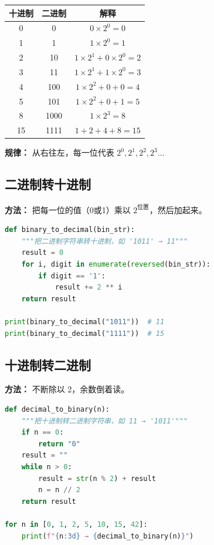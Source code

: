 \documentclass[a4paper,12pt]{ctexart}
\begin{document}
\begin{center}
\begin{tabular}{|c|c|c|}
\hline
\textbf{十进制} & \textbf{二进制} & \textbf{解释} \\ \hline
0 & 0 & $0 \times 2^0 = 0$ \\ \hline
1 & 1 & $1 \times 2^0 = 1$ \\ \hline
2 & 10 & $1 \times 2^1 + 0 \times 2^0 = 2$ \\ \hline
3 & 11 & $1 \times 2^1 + 1 \times 2^0 = 3$ \\ \hline
4 & 100 & $1 \times 2^2 + 0 + 0 = 4$ \\ \hline
5 & 101 & $1 \times 2^2 + 0 + 1 = 5$ \\ \hline
8 & 1000 & $1 \times 2^3 = 8$ \\ \hline
15 & 1111 & $1+2+4+8 = 15$ \\ \hline
\end{tabular}
\end{center}

\textbf{规律：} 从右往左，每一位代表 $2^0, 2^1, 2^2, 2^3 \dots$

\subsection*{二进制转十进制}

\textbf{方法：} 把每一位的值（0或1）乘以 $2^{\text{位置}}$，然后加起来。

\begin{lstlisting}[language=Python]
def binary_to_decimal(bin_str):
    """把二进制字符串转十进制，如 '1011' → 11"""
    result = 0
    for i, digit in enumerate(reversed(bin_str)):
        if digit == '1':
            result += 2 ** i
    return result

print(binary_to_decimal("1011"))  # 11
print(binary_to_decimal("1111"))  # 15
\end{lstlisting}

\subsection*{十进制转二进制}

\textbf{方法：} 不断除以 2，余数倒着读。

\begin{lstlisting}[language=Python]
def decimal_to_binary(n):
    """把十进制转二进制字符串，如 11 → '1011'"""
    if n == 0:
        return "0"
    result = ""
    while n > 0:
        result = str(n % 2) + result
        n = n // 2
    return result

for n in [0, 1, 2, 5, 10, 15, 42]:
    print(f"{n:3d} → {decimal_to_binary(n)}")
\end{lstlisting}
\end{document}
